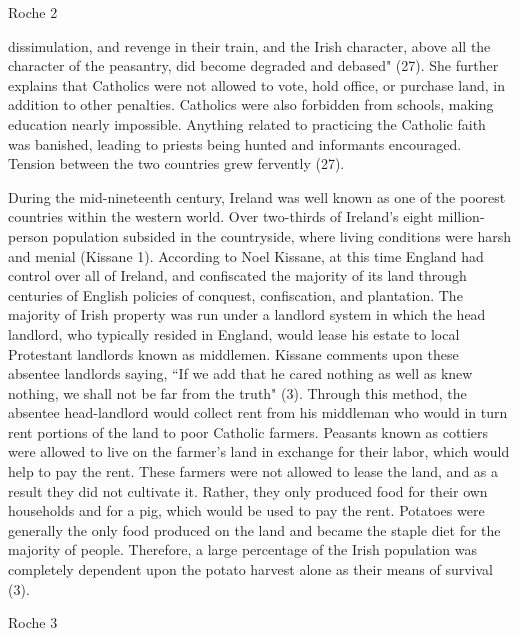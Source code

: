 \begin{Spacing}{1.5}
\newpage
\thispagestyle{empty}
\begin{flushright}Roche 2\end{flushright}

dissimulation, and revenge in their train, and the Irish character, above all the character of the peasantry, did become degraded and debased" (27).  She further explains that Catholics were not allowed to vote, hold office, or purchase land, in addition to other penalties. Catholics were also forbidden from schools, making education nearly impossible. Anything related to practicing the Catholic faith was banished, leading to priests being hunted and informants encouraged. Tension between the two countries grew fervently (27). 

\hspace{.4in}During the mid-nineteenth century, Ireland was well known as one of the poorest countries within the western world. Over two-thirds of Ireland’s eight million-person population subsided in the countryside, where living conditions were harsh and menial (Kissane 1). According to Noel Kissane, at this time England had control over all of Ireland, and confiscated the majority of its land through centuries of English policies of conquest, confiscation, and plantation. The majority of Irish property was run under a landlord system in which the head landlord, who typically resided in England, would lease his estate to local Protestant landlords known as middlemen. Kissane comments upon these absentee landlords saying, “If we add that he cared nothing as well as knew nothing, we shall not be far from the truth" (3). Through this method, the absentee head-landlord would collect rent from his middleman who would in turn rent portions of the land to poor Catholic farmers. Peasants known as cottiers were allowed to live on the farmer’s land in exchange for their labor, which would help to pay the rent. These farmers were not allowed to lease the land, and as a result they did not cultivate it. Rather, they only produced food for their own households and for a pig, which would be used to pay the rent. Potatoes were generally the only food produced on the land and became the staple diet for the majority of people. Therefore, a large percentage of the Irish population was completely dependent upon the potato harvest alone as their means of survival (3).
\newpage
\thispagestyle{empty}
\begin{flushright}Roche 3\end{flushright}


\end{Spacing}
